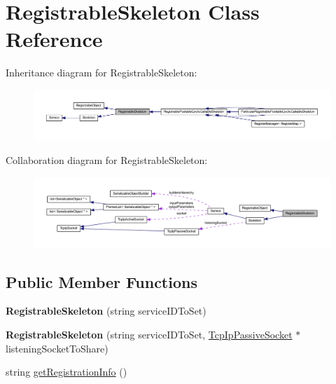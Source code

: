 \hypertarget{class_registrable_skeleton}{
\section{RegistrableSkeleton Class Reference}
\label{class_registrable_skeleton}
}


Inheritance diagram for RegistrableSkeleton:\nopagebreak
\begin{figure}[H]
\begin{center}
\leavevmode
\includegraphics[width=400pt]{class_registrable_skeleton__inherit__graph}
\end{center}
\end{figure}


Collaboration diagram for RegistrableSkeleton:\nopagebreak
\begin{figure}[H]
\begin{center}
\leavevmode
\includegraphics[width=400pt]{class_registrable_skeleton__coll__graph}
\end{center}
\end{figure}
\subsection*{Public Member Functions}
\begin{DoxyCompactItemize}
\item 
\hypertarget{class_registrable_skeleton_aff717c6cd2297fd84781ced9d09f379f}{
{\bfseries RegistrableSkeleton} (string serviceIDToSet)}
\label{class_registrable_skeleton_aff717c6cd2297fd84781ced9d09f379f}

\item 
\hypertarget{class_registrable_skeleton_a398e94fdca8dffa5165a5015bd65adc6}{
{\bfseries RegistrableSkeleton} (string serviceIDToSet, \hyperlink{class_tcp_ip_passive_socket}{TcpIpPassiveSocket} $\ast$listeningSocketToShare)}
\label{class_registrable_skeleton_a398e94fdca8dffa5165a5015bd65adc6}

\item 
string \hyperlink{class_registrable_skeleton_a15280df13fd0e6e6609c4c4324bd0829}{getRegistrationInfo} ()
\end{DoxyCompactItemize}


